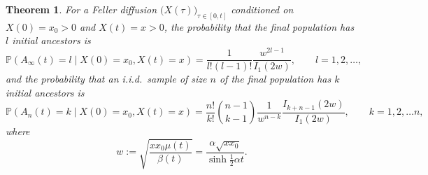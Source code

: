 \documentclass[preprint,12pt]{elsarticle}
\newtheorem{theorem}{Theorem}
\begin{document}
\begin{theorem}
For a Feller diffusion $\big(X(\tau)\big)_{\tau \in [0, t]}$ conditioned on $X(0) = x_0 > 0$ and $X(t) = x > 0$, the probability that the final population has 
$l$ initial ancestors is 
\begin{equation}	\label{ancestorsGivenX0X}
\mathbb{P}(A_\infty(t)  = l \mid X(0) = x_0, X(t) = x) = \frac{1}{l!(l - 1)!} \frac{w^{2l - 1}}{I_1(2w)}, \qquad l = 1, 2, \ldots, 
\end{equation}
and the probability that an i.i.d.\ sample of size $n$ of the final population has $k$ initial ancestors is 
\begin{equation}	\label{sampleGivenX0X}
\mathbb{P}(A_n(t)  = k \mid X(0) = x_0, X(t) = x) = \frac{n!}{k!} \binom{n - 1}{k - 1}\frac{1}{w^{n - k}} \frac{I_{k + n - 1}(2w)}{I_1(2w)}, \qquad k = 1, 2, \ldots n, 
\end{equation}
where 
\begin{equation*}	
w := \sqrt{\frac{xx_0\mu(t)}{\beta(t)}} = \frac{\alpha \sqrt{xx_0}}{\sinh \frac{1}{2}\alpha t}. 
\end{equation*}
\end{theorem}
%
\end{document}

